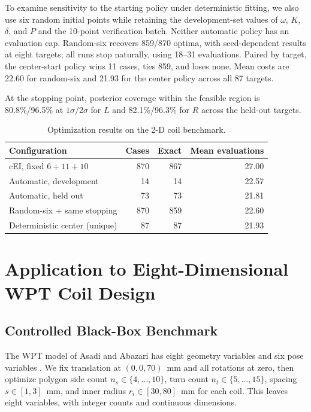\documentclass[10pt,conference,letterpaper]{IEEEtran}
\begin{document}
To examine sensitivity to the starting policy under deterministic fitting, we also use six random initial points while retaining the development-set values of $\omega$, $K$, $\delta$, and $P$ and the 10-point verification batch. Neither automatic policy has an evaluation cap. Random-six recovers 859/870 optima, with seed-dependent results at eight targets; all runs stop naturally, using 18--31 evaluations. Paired by target, the center-start policy wins 11 cases, ties 859, and loses none. Mean costs are 22.60 for random-six and 21.93 for the center policy across all 87 targets.

At the stopping point, posterior coverage within the feasible region is 80.8\%/96.5\% at $1\sigma/2\sigma$ for $L$ and 82.1\%/96.3\% for $R$ across the held-out targets.

\begin{table}[!t]
\caption{Optimization results on the 2-D coil benchmark.}
\label{tab:two-d}
\centering
\footnotesize
\begin{tabular}{@{}lrrr@{}}
\toprule
Configuration & Cases & Exact & Mean evaluations \\
\midrule
cEI, fixed $6+11+10$ & 870 & 867 & 27.00 \\
Automatic, development & 14 & 14 & 22.57 \\
Automatic, held out & 73 & 73 & 21.81 \\
Random-six + same stopping & 870 & 859 & 22.60 \\
Deterministic center (unique) & 87 & 87 & 21.93 \\
\bottomrule
\end{tabular}
\end{table}

\section{Application to Eight-Dimensional WPT Coil Design}
\subsection{Controlled Black-Box Benchmark}
The WPT model of Asadi and Abazari has eight geometry variables and six pose variables \cite{asadi2025}. We fix translation at $(0,0,70)$~mm and all rotations at zero, then optimize polygon side count $n_s\in\{4,\ldots,10\}$, turn count $n_t\in\{5,\ldots,15\}$, spacing $s\in[1,3]$~mm, and inner radius $r_i\in[30,80]$~mm for each coil. This leaves eight variables, with integer counts and continuous dimensions.
\end{document}

